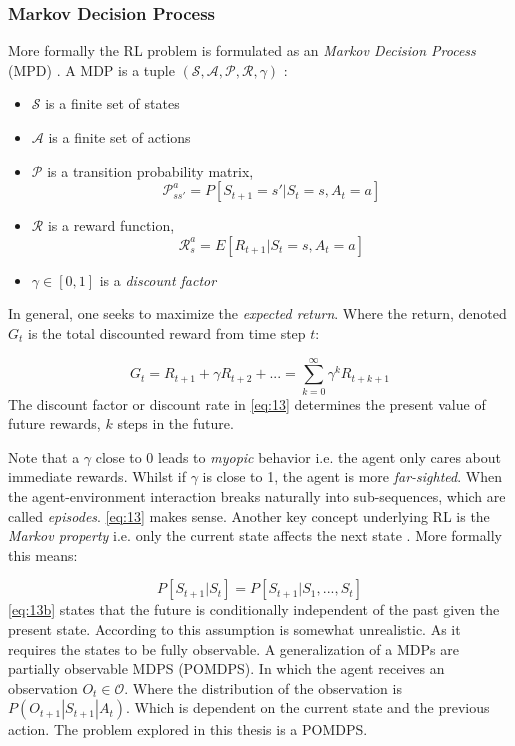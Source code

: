 \documentclass{kththesis}
\theoremstyle{definition}
\begin{document}
\subsubsection*{Markov Decision Process}
 More formally the RL problem is formulated as an \textit{Markov Decision Process} (MPD) \parencite{sutton1998reinforcement, li2017deep}. A MDP is a tuple $(\mathcal{S, A, P, R}, \gamma)$ \parencite{li2017deep}:
\begin{itemize}
    \item $\mathcal{S}$ is a finite set of states
    \item $\mathcal{A}$ is a finite set of actions
    \item $\mathcal{P}$ is a transition probability matrix, 
    \begin{equation} 
        \label{eq:12a}
        \mathcal{P}^{a}_{ss'} = P[S_{t+1} = s' | S_t =s, A_t = a]
    \end{equation}
    \item $\mathcal{R}$ is a reward function, 
    \begin{equation}
        \label{eq:12b}
        \mathcal{R}^{a}_{s} = E[R_{t+1} | S_t =s, A_t=a]
    \end{equation}
    \item $\gamma \in [0,1]$ is a \textit{discount factor} 
\end{itemize}
In general, one seeks to maximize the \textit{expected return}. Where the return, denoted $G_t$ is the total discounted reward from time step $t$:

\begin{equation}
    \label{eq:13}
    G_t = R_{t+1} + \gamma R_{t+2} + ... = \sum_{k=0}^{\infty}{\gamma^{k}R_{t+k+1}}
\end{equation}
The discount factor or discount rate in \autoref{eq:13} determines the present value of future rewards, $k$ steps in the future. 

\newpage
Note that a $\gamma$ close to 0 leads to \textit{myopic} behavior i.e. the agent only cares about immediate rewards. Whilst if $\gamma$ is close to 1, the agent is more \textit{far-sighted}. When the agent-environment interaction breaks naturally into sub-sequences, which are called \textit{episodes}.
\autoref{eq:13} makes sense. Another key concept underlying RL is the \textit{Markov property} i.e. only the current state affects the next state \parencite{arulkumaran2017brief}. More formally this means:

\begin{equation}
    \label{eq:13b}
    P[S_{t+1} | S_t] = P[S_{t+1} | S_1, ..., S_t]
\end{equation}
\autoref{eq:13b} states that the future is conditionally independent of the past given the present state. According to \textcite{arulkumaran2017brief} this assumption is somewhat unrealistic. As it requires the states to be fully observable. A generalization of a MDPs are partially observable MDPS (POMDPS). In which the agent receives an observation $O_t \in \mathcal{O}$. Where the distribution of the observation is $P(O_{t+1} | S_{t+1} | A_t)$\parencite{arulkumaran2017brief}. Which is dependent on the current state and the previous action. The problem explored in this thesis is a POMDPS.
\end{document}
